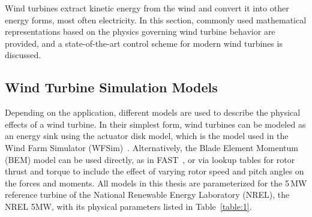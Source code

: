 Wind turbines extract kinetic energy from the wind and convert it into other energy forms, most often electricity. In this section, commonly used mathematical representations based on the physics governing wind turbine behavior are provided, and a state-of-the-art control scheme for modern wind turbines is discussed.

\subsection{Wind Turbine Simulation Models}\label{windTurbineModel}
Depending on the application, different models are used to describe the physical effects of a wind turbine. In their simplest form, wind turbines can be modeled as an energy sink using the actuator disk model, which is the model used in the Wind Farm Simulator (WFSim)~\cite{boersma2018control}. Alternatively, the Blade Element Momentum (BEM) model can be used directly, as in FAST~\cite{jonkman2005fast}, or via lookup tables for rotor thrust and torque to include the effect of varying rotor speed and pitch angles on the forces and moments. All models in this thesis are parameterized for the 5\,MW reference turbine of the National Renewable Energy Laboratory (NREL), the NREL 5MW, with its physical parameters listed in Table~\ref{table:1}.

